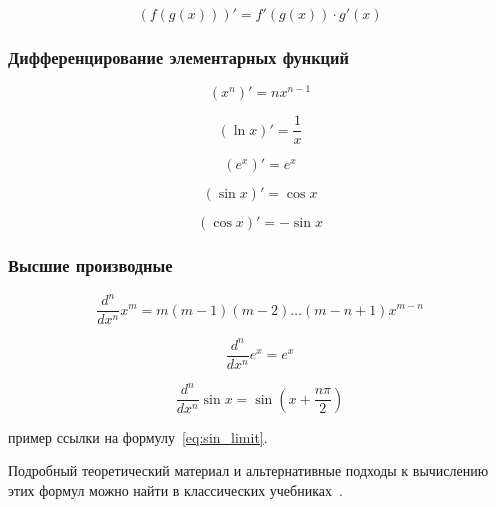 \documentclass[a4paper,12pt]{article}
\begin{document}
\begin{equation}
(f(g(x)))' = f'(g(x)) \cdot g'(x)
\end{equation}

\subsubsection{Дифференцирование элементарных функций}
\setcounter{equation}{0}

\begin{equation}
(x^n)' = nx^{n-1}
\end{equation}

\begin{equation}
(\ln x)' = \frac{1}{x}
\end{equation}

\begin{equation}
(e^x)' = e^x
\end{equation}

\begin{equation}
(\sin x)' = \cos x
\end{equation}

\begin{equation}
(\cos x)' = -\sin x
\end{equation}

\subsubsection{Высшие производные}
\setcounter{equation}{0}

\begin{equation}
\frac{d^n}{dx^n} x^m = m(m-1)(m-2)\dots(m-n+1)x^{m-n}
\end{equation}

\begin{equation}
\frac{d^n}{dx^n} e^x = e^x
\end{equation}

\begin{equation}
\frac{d^n}{dx^n} \sin x = \sin\left(x + \frac{n\pi}{2}\right)
\end{equation}

пример ссылки на формулу~\ref{eq:sin_limit}.

Подробный теоретический материал и альтернативные подходы к вычислению этих 
формул можно найти в классических учебниках~\cite{zorich, demin, r, c}.
\end{document}
